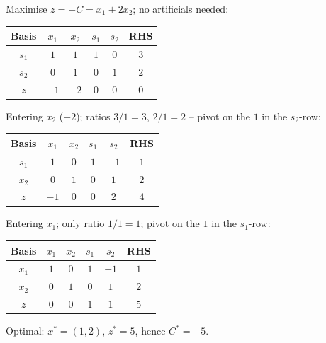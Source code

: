 \begin{solutions}
  \item Maximise $z=-C=x_{1}+2x_{2}$; no artificials needed:
        \begin{center}
        \begin{tabular}{c|cccc|c}
        Basis & $x_{1}$ & $x_{2}$ & $s_{1}$ & $s_{2}$ & RHS\\
        \hline
        $s_{1}$ & $1$ & $1$ & $1$ & $0$ & $3$\\
        $s_{2}$ & $0$ & $1$ & $0$ & $1$ & $2$\\
        \hline
        $z$ & $-1$ & $-2$ & $0$ & $0$ & $0$\\
        \end{tabular}
        \end{center}
        Entering $x_{2}$ ($-2$); ratios $3/1=3$, $2/1=2$ -- pivot on the
        $1$ in the $s_{2}$-row:
        \begin{center}
        \begin{tabular}{c|cccc|c}
        Basis & $x_{1}$ & $x_{2}$ & $s_{1}$ & $s_{2}$ & RHS\\
        \hline
        $s_{1}$ & $1$ & $0$ & $1$ & $-1$ & $1$\\
        $x_{2}$ & $0$ & $1$ & $0$ & $1$ & $2$\\
        \hline
        $z$ & $-1$ & $0$ & $0$ & $2$ & $4$\\
        \end{tabular}
        \end{center}
        Entering $x_{1}$; only ratio $1/1=1$; pivot on the $1$ in the
        $s_{1}$-row:
        \begin{center}
        \begin{tabular}{c|cccc|c}
        Basis & $x_{1}$ & $x_{2}$ & $s_{1}$ & $s_{2}$ & RHS\\
        \hline
        $x_{1}$ & $1$ & $0$ & $1$ & $-1$ & $1$\\
        $x_{2}$ & $0$ & $1$ & $0$ & $1$ & $2$\\
        \hline
        $z$ & $0$ & $0$ & $1$ & $1$ & $5$\\
        \end{tabular}
        \end{center}
        Optimal: $x^{*}=(1,2)$, $z^{*}=5$, hence $C^{*}=-5$.


\end{solutions}
